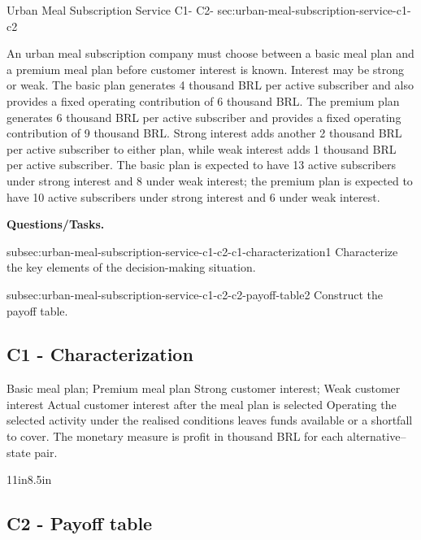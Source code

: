 	\sectionScored
	{Urban Meal Subscription Service}
	{C1- \hspace{2mm} C2-}
	{sec:urban-meal-subscription-service-c1-c2}
	{
		An urban meal subscription company must choose between a basic meal plan and a premium meal plan before customer interest is known. Interest may be strong or weak. The basic plan generates 4 thousand BRL per active subscriber and also provides a fixed operating contribution of 6 thousand BRL. The premium plan generates 6 thousand BRL per active subscriber and provides a fixed operating contribution of 9 thousand BRL. Strong interest adds another 2 thousand BRL per active subscriber to either plan, while weak interest adds 1 thousand BRL per active subscriber. The basic plan is expected to have 13 active subscribers under strong interest and 8 under weak interest; the premium plan is expected to have 10 active subscribers under strong interest and 6 under weak interest.
		
		\textbf{Questions/Tasks.}
		\begin{enumerate}
			\CriterionTask
			{subsec:urban-meal-subscription-service-c1-c2-c1-characterization}{1}
			{Characterize the key elements of the decision-making situation. }
			
			\CriterionTask
			{subsec:urban-meal-subscription-service-c1-c2-c2-payoff-table}{2}
			{Construct the payoff table. }
		\end{enumerate}
		
		\label{subsec:urban-meal-subscription-service-c1-c2-c1-characterization}
		\subsection*{C1 - Characterization }
		
		\DecisionElementsTable
{Basic meal plan; Premium meal plan}
{Strong customer interest; Weak customer interest}
{Actual customer interest after the meal plan is selected}
{Operating the selected activity under the realised conditions leaves funds available or a shortfall to cover. The monetary measure is profit in thousand BRL for each alternative--state pair.}

		
		\begin{CalculationLandscape}{11in}{8.5in}
		\label{subsec:urban-meal-subscription-service-c1-c2-c2-payoff-table}
		\subsection*{C2 - Payoff table }
		

\end{CalculationLandscape}}
